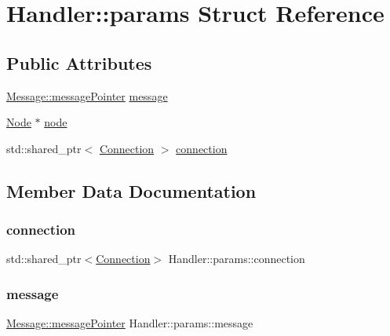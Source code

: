 \hypertarget{structHandler_1_1params}{}\section{Handler\+:\+:params Struct Reference}
\label{structHandler_1_1params}
\subsection*{Public Attributes}
\begin{DoxyCompactItemize}
\item 
\mbox{\hyperlink{classMessage_a3f7f2aa1058cb5f0b74a1fbb7fcd00e5}{Message\+::message\+Pointer}} \mbox{\hyperlink{structHandler_1_1params_a2625bc9e0e823431c8039b587e0dd7ee}{message}}
\item 
\mbox{\hyperlink{classNode}{Node}} $\ast$ \mbox{\hyperlink{structHandler_1_1params_a9c2d75c37d122d3b8186a5b37c1d2526}{node}}
\item 
std\+::shared\+\_\+ptr$<$ \mbox{\hyperlink{classConnection}{Connection}} $>$ \mbox{\hyperlink{structHandler_1_1params_acea9549fb1dc08daadd963a1bcbd435e}{connection}}
\end{DoxyCompactItemize}


\subsection{Member Data Documentation}
\mbox{\label{structHandler_1_1params_acea9549fb1dc08daadd963a1bcbd435e}} 
\subsubsection{\texorpdfstring{connection}{connection}}
{\footnotesize\ttfamily std\+::shared\+\_\+ptr$<$\mbox{\hyperlink{classConnection}{Connection}}$>$ Handler\+::params\+::connection}

\mbox{\label{structHandler_1_1params_a2625bc9e0e823431c8039b587e0dd7ee}} 
\subsubsection{\texorpdfstring{message}{message}}
{\footnotesize\ttfamily \mbox{\hyperlink{classMessage_a3f7f2aa1058cb5f0b74a1fbb7fcd00e5}{Message\+::message\+Pointer}} Handler\+::params\+::message}

